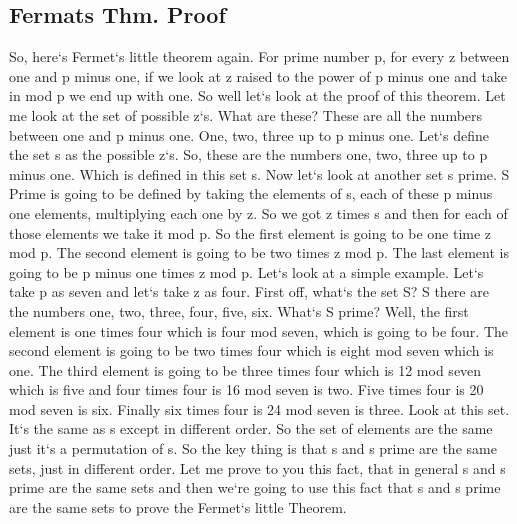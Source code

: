 \subsection{Fermats Thm.  Proof}
So, here`s Fermet`s little theorem again.
For prime number p, for every z between one and p minus one, if we look at z raised to the power of p minus one and take in mod p we end up with one.
So well let`s look at the proof of this theorem.
Let me look at the set of possible z`s.
What are these? These are all the numbers between one and p minus one.
One, two, three up to p minus one.
Let`s define the set s as the possible z`s.
So, these are the numbers one, two, three up to p minus one.
Which is defined in this set s.
Now let`s look at another set s prime.
S Prime is going to be defined by taking the elements of s, each of these p minus one elements, multiplying each one by z.
So we got z times s and then for each of those elements we take it mod p.
So the first element is going to be one time z mod p.
The second element is going to be two times z mod p.
The last element is going to be p minus one times z mod p.
Let`s look at a simple example.
Let`s take p as seven and let`s take z as four.
First off, what`s the set S? S there are the numbers one, two, three, four, five, six.
What`s S prime? Well, the first element is one times four which is four mod seven, which is going to be four.
The second element is going to be two times four which is eight mod seven which is one.
The third element is going to be three times four which is 12 mod seven which is five and four times four is 16 mod seven is two.
Five times four is 20 mod seven is six.
Finally six times four is 24 mod seven is three.
Look at this set.
It`s the same as s except in different order.
So the set of elements are the same just it`s a permutation of s.
So the key thing is that s and s prime are the same sets, just in different order.
Let me prove to you this fact, that in general s and s prime are the same sets and then we`re going to use this fact that s and s prime are the same sets to prove the Fermet`s little Theorem.

